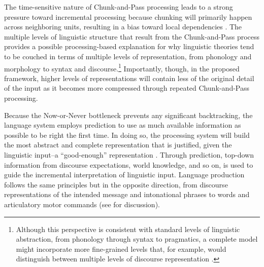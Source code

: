 \documentclass[output=paper]{langsci/langscibook}
\begin{document}
\newpage 
{}    The time-sensitive nature of Chunk-and-Pass processing leads to a strong pressure toward incremental processing because chunking will primarily happen across neighboring units, resulting in a bias toward local dependencies \citep[in line with evidence for garden path effects in language comprehension; e.g.,][]{Bever1970}. The multiple levels of linguistic structure that result from the Chunk-and-Pass process provides a possible processing-based explanation for why linguistic theories tend to be couched in terms of multiple levels of representation, from phonology and morphology to syntax and discourse.\footnote{ Although this perspective is consistent with standard levels of linguistic abstraction, from phonology through syntax to pragmatics, a complete model might incorporate more fine-grained levels that, for example, would distinguish between multiple levels of discourse representation \citep[e.g., as in][]{Enfield2013}.} Importantly, though, in the proposed framework, higher levels of representations will contain less of the original detail of the input as it becomes more compressed through repeated Chunk-and-Pass processing.
 
\largerpage[-1] 
Because the Now-or-Never bottleneck prevents any significant backtracking, the language system employs prediction to use as much available information as possible to be right the first time. In doing so, the processing system will build the most abstract and complete representation that is justified, given the linguistic input--a “good-enough” representation \citep{Ferreira2002,Ferreira2007}. Through prediction, top-down information from discourse expectations, world knowledge, and so on, is used to guide the incremental interpretation of linguistic input. Language production follows the same principles but in the opposite direction, from discourse representations of the intended message and intonational phrases to words and articulatory motor commands (see \citealt{ChaterSqueezeInPress,ChaterLanguageInPress} for discussion). 
\end{document}
